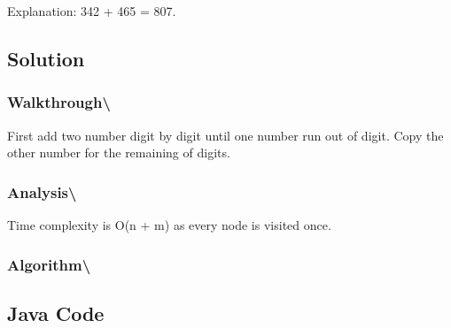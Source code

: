 \documentclass[]{book}
\begin{document}
Explanation: 342 + 465 = 807.

\hypertarget{solution-59}{%
\subsection{Solution}\label{solution-59}}

\hypertarget{walkthrough-100}{%
\subsubsection{Walkthrough\textbackslash{}}\label{walkthrough-100}}

First add two number digit by digit until one number run out of digit. Copy the other number for the remaining
of digits.

\hypertarget{analysis-107}{%
\subsubsection{Analysis\textbackslash{}}\label{analysis-107}}

Time complexity is O(n + m) as every node is visited once.

\hypertarget{algorithm-113}{%
\subsubsection{Algorithm\textbackslash{}}\label{algorithm-113}}

\hypertarget{java-code-66}{%
\subsection{Java Code}\label{java-code-66}}
\end{document}
